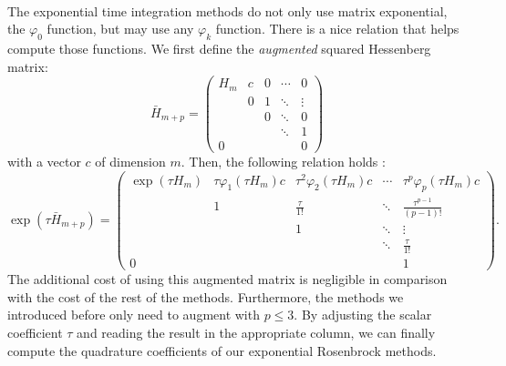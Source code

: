       \paragraph{}
      The exponential time integration methods do not only use matrix exponential, the $\varphi_0$ function, but may use any $\varphi_k$ function.
      There is a nice relation that helps compute those functions.
      We first define the \emph{augmented} squared Hessenberg matrix:
      \begin{equation}
        \bar{H}_{m + p} = \begin{pmatrix}
          H_m & c & 0 & \cdots & 0      \\
              & 0 & 1 & \ddots & \vdots \\
              &   & 0 & \ddots & 0      \\
              &   &   & \ddots & 1      \\
          0   &   &   &        & 0
        \end{pmatrix}
      \end{equation}
      with a vector $c$ of dimension $m$.
      Then, the following relation holds \cite{Sidje1998}:
      \begingroup
      \renewcommand*{\arraystretch}{1.5}
      \begin{equation}
        \exp\left(\tau \bar{H}_{m + p}\right) = \begin{pmatrix}
          \exp\left(\tau H_m\right) & \tau \varphi_1\left(\tau H_m\right) c & \tau^2 \varphi_2\left(\tau H_m\right) c & \cdots & \tau^p \varphi_p\left(\tau H_m\right) c \\
                                    & 1                                     & \frac{\tau}{1!}                         & \ddots & \frac{\tau^{p-1}}{\left(p - 1\right)!}  \\
                                    &                                       & 1                                       & \ddots & \vdots                                  \\
                                    &                                       &                                         & \ddots & \frac{\tau}{1!}                         \\
          0                         &                                       &                                         &        & 1
        \end{pmatrix} .
      \end{equation}
      \endgroup
      The additional cost of using this augmented matrix is negligible in comparison with the cost of the rest of the methods.
      Furthermore, the methods we introduced before only need to augment with $p \leq 3$.
      By adjusting the scalar coefficient $\tau$ and reading the result in the appropriate column, we can finally compute the quadrature coefficients of our exponential Rosenbrock methods.


